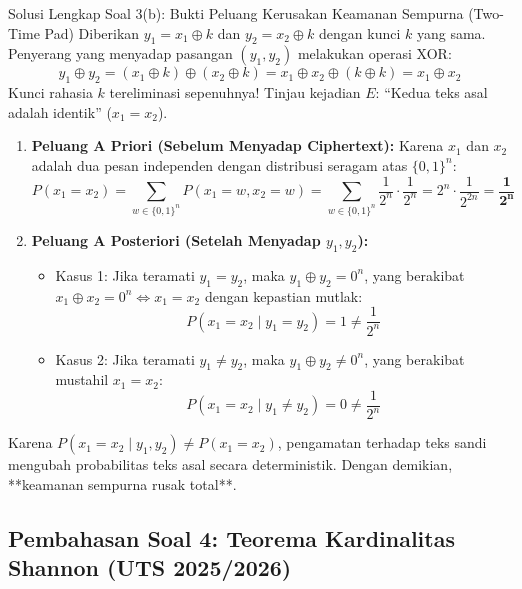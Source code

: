 \documentclass[11pt,a4paper]{article}
\begin{document}
\begin{solusibox}{Solusi Lengkap Soal 3(b): Bukti Peluang Kerusakan Keamanan Sempurna (Two-Time Pad)}
Diberikan $y_1 = x_1 \oplus k$ dan $y_2 = x_2 \oplus k$ dengan kunci $k$ yang sama.
Penyerang yang menyadap pasangan $(y_1, y_2)$ melakukan operasi XOR:
\[
y_1 \oplus y_2 = (x_1 \oplus k) \oplus (x_2 \oplus k) = x_1 \oplus x_2 \oplus (k \oplus k) = x_1 \oplus x_2
\]
Kunci rahasia $k$ tereliminasi sepenuhnya!
Tinjau kejadian $E$: ``Kedua teks asal adalah identik'' ($x_1 = x_2$).
\begin{enumerate}
    \item \textbf{Peluang A Priori (Sebelum Menyadap Ciphertext):}
    Karena $x_1$ dan $x_2$ adalah dua pesan independen dengan distribusi seragam atas $\{0, 1\}^n$:
    \[
    P(x_1 = x_2) = \sum_{w \in \{0, 1\}^n} P(x_1 = w, x_2 = w) = \sum_{w \in \{0, 1\}^n} \frac{1}{2^n} \cdot \frac{1}{2^n} = 2^n \cdot \frac{1}{2^{2n}} = \mathbf{\frac{1}{2^n}}
    \]
    \item \textbf{Peluang A Posteriori (Setelah Menyadap $y_1, y_2$):}
    \begin{itemize}
        \item Kasus 1: Jika teramati $y_1 = y_2$, maka $y_1 \oplus y_2 = 0^n$, yang berakibat $x_1 \oplus x_2 = 0^n \iff x_1 = x_2$ dengan kepastian mutlak:
        \[
        P(x_1 = x_2 \mid y_1 = y_2) = 1 \ne \frac{1}{2^n}
        \]
        \item Kasus 2: Jika teramati $y_1 \ne y_2$, maka $y_1 \oplus y_2 \ne 0^n$, yang berakibat mustahil $x_1 = x_2$:
        \[
        P(x_1 = x_2 \mid y_1 \ne y_2) = 0 \ne \frac{1}{2^n}
        \]
    \end{itemize}
\end{enumerate}
Karena $P(x_1 = x_2 \mid y_1, y_2) \ne P(x_1 = x_2)$, pengamatan terhadap teks sandi mengubah probabilitas teks asal secara deterministik.
Dengan demikian, **keamanan sempurna rusak total**.
\end{solusibox}

\newpage

\subsection{Pembahasan Soal 4: Teorema Kardinalitas Shannon (UTS 2025/2026)}
\end{document}
